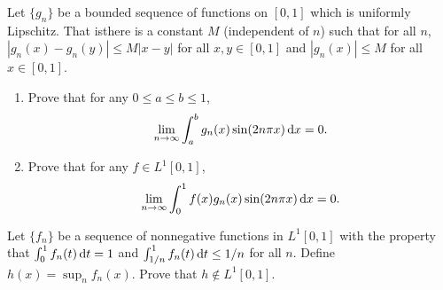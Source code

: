 \begin{problem}
  Let $\{g_n\}$ be a bounded sequence of functions on $[0,1]$ which is
  uniformly Lipschitz. That isthere is a constant $M$ (independent of $n$)
  such that for all $n$, $|g_n(x)-g_n(y)|\leq M|x-y|$ for all $x,y\in
  [0,1]$ and $|g_n(x)|\leq M$ for all $x\in[0,1]$.
  \begin{enumerate}[label=(\roman*),noitemsep]
  \item Prove that for any $0\leq a\leq b\leq 1$,
    \[
      \lim_{n\to\infty}\int_a^b g_n(x)\sin(2n\pi x)\mathop{}\!\mathrm{d} x=0.
    \]
  \item Prove that for any $f\in L^1[0,1]$,
    \[
      \lim_{n\to\infty}\int_0^1 f(x)g_n(x)\sin(2n\pi x)\mathop{}\!\mathrm{d} x=0.
    \]
  \end{enumerate}
\end{problem}
\begin{solution}
\end{solution}

\begin{problem}
  Let $\{f_n\}$ be a sequence of nonnegative functions in $L^1[0,1]$ with
  the property that $\int_0^1 f_n(t)\mathop{}\!\mathrm{d} t=1$ and $\int_{1/n}^1
  f_n(t)\mathop{}\!\mathrm{d} t\leq 1/n$ for all $n$. Define $h(x)=\sup_n f_n(x)$. Prove
  that $h\notin L^1[0,1]$.
\end{problem}
\begin{solution}
\end{solution}

